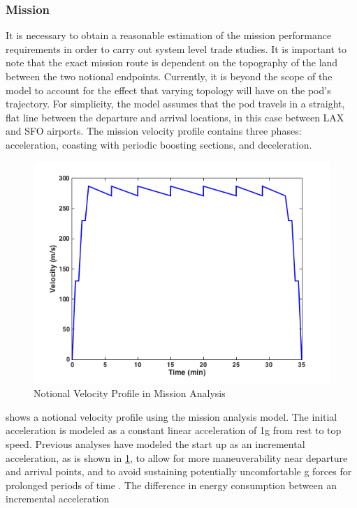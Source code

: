 
\subsubsection{Mission}
	It is necessary to obtain a reasonable estimation of the mission
	performance requirements in order to carry out system level trade studies.
	It is important to note that the exact mission route is dependent on the
	topography of the land between the two notional endpoints. Currently, it is
	beyond the scope of the model to account for the effect that varying
	topology will have on the pod’s trajectory. For simplicity, the model
	assumes that the pod travels in a straight, flat line between the departure
	and arrival locations, in this case between LAX and SFO airports.
	The mission velocity profile contains three phases: acceleration, coasting
	with periodic boosting sections, and deceleration.
	\begin{figure}
		\centering
		\includegraphics{../images/mission_profile.png}
		\caption{Notional Velocity Profile in Mission Analysis}
		\label{fig:mission_profile}
	\end{figure}
	 shows a notional velocity profile using the
	mission analysis model. The initial acceleration is
	modeled as a constant linear acceleration of 1g from rest to top speed.
	Previous analyses have modeled the start up as an incremental acceleration,
	as is shown in \cref{fig:mission_profile}, to allow for more maneuverability
	near departure and arrival points, and to avoid sustaining potentially
	uncomfortable g forces for prolonged periods of time \cite{Chin}.
	The difference in energy consumption between an incremental acceleration
